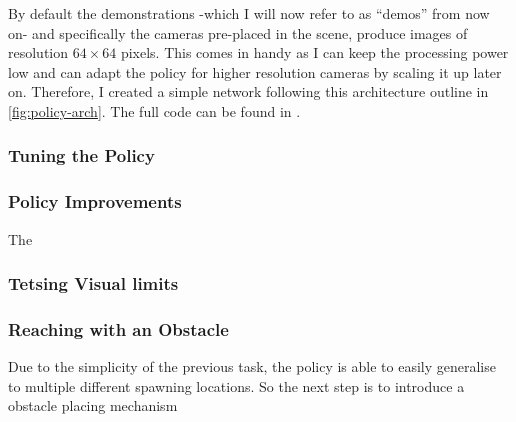 

\noindent By default the demonstrations -which I will now refer to as ``demos'' from now on- and specifically the cameras pre-placed in the scene, produce images of resolution $64 \times 64$ pixels. This comes in handy as I can keep the processing power low and can adapt the policy for higher resolution cameras by scaling it up later on. Therefore, I created a simple network following this architecture outline in \ref{fig:policy-arch}. The full code can be found in .

\label{fig:policy-arch}

\subsubsection{Tuning the Policy}

\subsubsection{Policy Improvements}

The

\subsubsection{Tetsing Visual limits}

\subsubsection{Reaching with an Obstacle}
Due to the simplicity of the previous task, the policy is able to easily generalise to multiple different spawning locations. So the next step is to introduce a obstacle placing mechanism 
